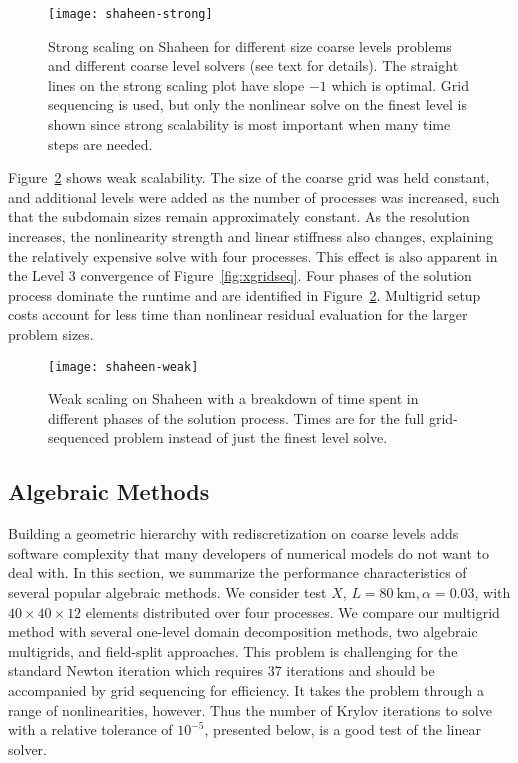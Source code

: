 \documentclass[final]{siamltex}
\begin{document}
\begin{figure}
  \centering\texttt{[image: shaheen-strong]}
  \caption{Strong scaling on Shaheen for different size coarse levels problems and different coarse level solvers (see text for details).
    The straight lines on the strong scaling plot have slope $-1$ which is optimal.
    Grid sequencing is used, but only the nonlinear solve on the finest level is shown since strong scalability is most important when many time steps are needed.}\label{fig:shaheen-strong}
\end{figure}

Figure~\ref{fig:shaheen-weak} shows weak scalability.
The size of the coarse grid was held constant, and additional levels were added as the number of processes was increased, such that the subdomain sizes remain approximately constant.
As the resolution increases, the nonlinearity strength and linear stiffness also changes, explaining the relatively expensive solve with four processes.
This effect is also apparent in the Level 3 convergence of Figure~\ref{fig:xgridseq}.
Four phases of the solution process dominate the runtime and are identified in Figure~\ref{fig:shaheen-weak}.
Multigrid setup costs account for less time than nonlinear residual evaluation for the larger problem sizes.

\begin{figure}
  \centering\texttt{[image: shaheen-weak]}
  \caption{Weak scaling on Shaheen with a breakdown of time spent in different phases of the solution process.
    Times are for the full grid-sequenced problem instead of just the finest level solve.}\label{fig:shaheen-weak}
\end{figure}

\subsection{Algebraic Methods}\label{sec:1level}
Building a geometric hierarchy with rediscretization on coarse levels adds software complexity that many developers of numerical models do not want to deal with.  In this section, we summarize the performance characteristics of several popular algebraic methods.  We consider test $X$, $L = \SI{80}{\kilo\metre}, \alpha=0.03$, with $40\times 40\times 12$ elements distributed over four processes. We compare our multigrid method with several one-level domain decomposition methods, two algebraic multigrids, and field-split approaches. This problem is challenging for the standard Newton iteration which requires 37 iterations and should be accompanied by grid sequencing for efficiency. It takes the problem through a range of nonlinearities, however. Thus the number of Krylov iterations to solve with a relative tolerance of $10^{-5}$, presented below, is a good test of the linear solver.
\end{document}
